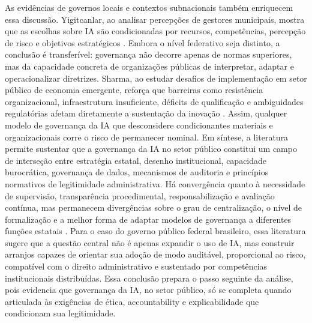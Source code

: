 \documentclass[12pt,a4paper]{article}
\begin{document}
As evidências de governos locais e contextos subnacionais também enriquecem essa discussão. Yigitcanlar, ao analisar percepções de gestores municipais, mostra que as escolhas sobre IA são condicionadas por recursos, competências, percepção de risco e objetivos estratégicos \autocite{yiitcanlar2022artificial}. Embora o nível federativo seja distinto, a conclusão é transferível: governança não decorre apenas de normas superiores, mas da capacidade concreta de organizações públicas de interpretar, adaptar e operacionalizar diretrizes. Sharma, ao estudar desafios de implementação em setor público de economia emergente, reforça que barreiras como resistência organizacional, infraestrutura insuficiente, déficits de qualificação e ambiguidades regulatórias afetam diretamente a sustentação da inovação \autocite{sharma2021implementing}. Assim, qualquer modelo de governança da IA que desconsidere condicionantes materiais e organizacionais corre o risco de permanecer nominal.
Em síntese, a literatura permite sustentar que a governança da IA no setor público constitui um campo de interseção entre estratégia estatal, desenho institucional, capacidade burocrática, governança de dados, mecanismos de auditoria e princípios normativos de legitimidade administrativa. Há convergência quanto à necessidade de supervisão, transparência procedimental, responsabilização e avaliação contínua, mas permanecem divergências sobre o grau de centralização, o nível de formalização e a melhor forma de adaptar modelos de governança a diferentes funções estatais \autocite{batool2025ai} \autocite{sigfrids2022how} \autocite{parycek2023artificial}. Para o caso do governo público federal brasileiro, essa literatura sugere que a questão central não é apenas expandir o uso de IA, mas construir arranjos capazes de orientar sua adoção de modo auditável, proporcional ao risco, compatível com o direito administrativo e sustentado por competências institucionais distribuídas. Essa conclusão prepara o passo seguinte da análise, pois evidencia que governança da IA, no setor público, só se completa quando articulada às exigências de ética, accountability e explicabilidade que condicionam sua legitimidade.
\end{document}

